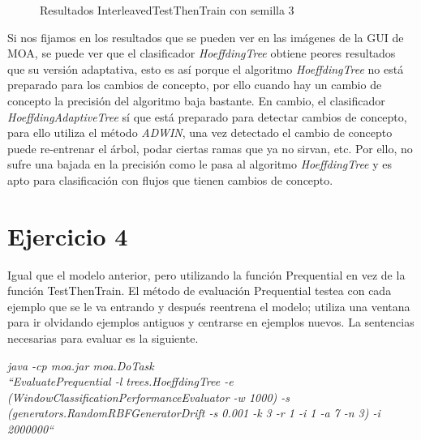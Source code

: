 \begin{figure}[H]
	\centering
	\caption{Resultados InterleavedTestThenTrain con semilla 3}
	\label{fig:res33}
\end{figure}
Si nos fijamos en los resultados que se pueden ver en las imágenes
de la GUI de MOA, se puede ver que el clasificador \textit{HoeffdingTree} obtiene
peores resultados que su versión adaptativa, esto es así porque el
algoritmo \textit{HoeffdingTree} no está preparado para los cambios de concepto,
por ello cuando hay un cambio de concepto la precisión del algoritmo
baja bastante. En cambio, el clasificador \textit{HoeffdingAdaptiveTree} sí que
está preparado para detectar cambios de concepto, para ello utiliza el
método \textit{ADWIN}, una vez detectado el cambio de concepto puede re-entrenar
el árbol, podar ciertas ramas que ya no sirvan, etc. Por ello, no
sufre una bajada en la precisión como le pasa al algoritmo \textit{HoeffdingTree}
y es apto para clasificación con flujos que tienen cambios de concepto.

\section{Ejercicio 4}
Igual que el modelo anterior, pero utilizando la función Prequential en vez de la función TestThenTrain. El método de evaluación Prequential testea con cada ejemplo que se le va entrando y después reentrena el modelo; utiliza una ventana para ir olvidando ejemplos antiguos y centrarse en ejemplos nuevos. La sentencias necesarias para evaluar es la siguiente.
\vspace{0.06in}

\textit{java -cp moa.jar moa.DoTask \\ ``EvaluatePrequential -l trees.HoeffdingTree
-e (WindowClassificationPerformanceEvaluator -w 1000) -s
(generators.RandomRBFGeneratorDrift -s 0.001 -k 3 -r 1 -i 1 -a 7 -n 3)
-i 2000000``}

